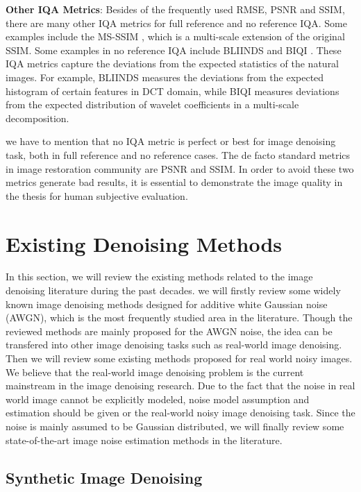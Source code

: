 \textbf{Other IQA Metrics}: Besides of the frequently used RMSE, PSNR and SSIM, there are many other IQA metrics for full reference and no reference IQA. Some examples include the MS-SSIM \cite{msssim}, which is a multi-scale extension of the original SSIM. Some examples in no reference IQA include BLIINDS \cite{bliinds} and BIQI \cite{biqi}. These IQA metrics capture the deviations from the expected statistics of the natural images. For example, BLIINDS measures the deviations from the expected histogram of certain features in DCT domain, while BIQI measures deviations from the expected distribution of wavelet coefficients in a multi-scale decomposition.

we have to mention that no IQA metric is perfect or best for image denoising task, both in full reference and no reference cases. The de facto standard metrics in image restoration community are PSNR and SSIM. In order to avoid these two metrics generate bad results, it is essential to demonstrate the image quality in the thesis for human subjective evaluation.


\section{Existing Denoising Methods}

In this section, we will review the existing methods related to the image denoising literature during the past decades. we will firstly review some widely known image denoising methods designed for additive white Gaussian noise (AWGN), which is the most frequently studied area in the literature. Though the reviewed methods are mainly proposed for the AWGN noise, the idea can be transfered into other image denoising tasks such as real-world image denoising. Then we will review some existing methods proposed for real world noisy images. We believe that the real-world image denoising problem is the current mainstream in the image denoising research. Due to the fact that the noise in real world image cannot be explicitly modeled, noise model assumption and estimation should be given or the real-world noisy image denoising task. Since the noise is mainly assumed to be Gaussian distributed, we will finally review some state-of-the-art image noise estimation methods in the literature.

\subsection{Synthetic Image Denoising}
\label{sec:review:sys}

